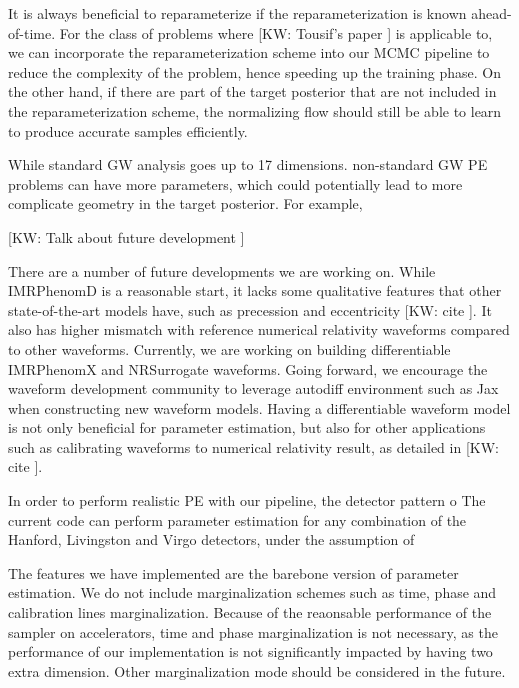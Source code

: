 \documentclass[twocolumn]{aastex631}
\newcommand{\kw}[1]{{\color{rb4}[KW: #1 ]}}
\begin{document}
It is always beneficial to reparameterize if the reparameterization is known
ahead-of-time. For the class of problems where \kw{Tousif's paper} is applicable
to, we can incorporate the reparameterization scheme into our MCMC pipeline to
reduce the complexity of the problem, hence speeding up the training phase.
On the other hand, if there are part of the target posterior that are not
included in the reparameterization scheme, the normalizing flow should still be
able to learn to produce accurate samples efficiently.


While standard GW analysis goes up to 17 dimensions. non-standard GW PE problems
can have more parameters, which could potentially lead to more complicate
geometry in the target posterior. For example, 

\kw{Talk about future development}

There are a number of future developments we are working on. While IMRPhenomD is
a reasonable start, it lacks some qualitative features that other
state-of-the-art models have, such as precession and eccentricity \kw{cite}. It
also has higher mismatch with reference numerical relativity waveforms compared
to other waveforms. Currently, we are working on building differentiable
IMRPhenomX and NRSurrogate waveforms. Going forward, we encourage the waveform
development community to leverage autodiff environment such as Jax when
constructing new waveform models. Having a differentiable waveform model is not
only beneficial for parameter estimation, but also for other applications such
as calibrating waveforms to numerical relativity result, as detailed in
\kw{cite}.



In order to perform realistic PE with our pipeline, the detector pattern o
The current code can perform parameter estimation for any combination of the
Hanford, Livingston and Virgo detectors, under the assumption of 

The features we have implemented are the barebone version of parameter
estimation. We do not include marginalization schemes such as time, phase and
calibration lines marginalization. Because of the reaonsable performance of the sampler on
accelerators, time and phase marginalization is not necessary, as the
performance of our implementation is not significantly impacted by having two
extra dimension. Other marginalization mode should be considered in the future.
\end{document}

